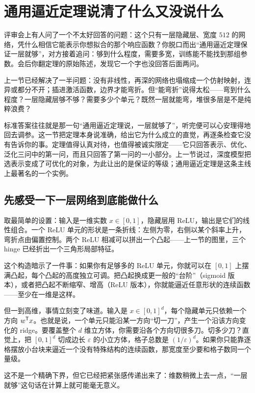 \section{通用逼近定理说清了什么又没说什么}
\label{sec:14-Deep-Learning/01-Representation-and-Approximation/02}


评审会上有人问了一个不太好回答的问题：这个只有一层隐藏层、宽度 \(512\) 的网络，凭什么相信它能表示你想拟合的那个响应函数？你脱口而出``通用逼近定理保证一层就够''，对方接着追问：够到什么程度，需要多宽，训练能不能找到那组参数。会后你翻定理的原始陈述，发现它一个字也没回答后面两问。

上一节已经解决了一半问题：没有非线性，再深的网络也塌缩成一个仿射映射，连异或都分不开；插进激活函数，边界才能弯折。但``能弯折''说得太松——弯到什么程度？一层隐藏层够不够？需要多少个单元？既然一层就能弯，堆很多层是不是纯粹浪费？

标准答案往往就是那一句``通用逼近定理说，一层就够了''，听完便可以心安理得地回去调参。这一节把定理本身说准确，给出它为什么成立的直觉，再逐条检查它没有告诉你的事。定理值得认真对待，也值得被诚实限定——它只回答表示、优化、泛化三问中的第一问，而且只回答了第一问的一小部分。上一节说过，深度模型把选表示变成了可优化的对象，为此让出的是保证的等级；通用逼近定理是这条主线上最著名的一个实例。

\subsection{先感受一下一层网络到底能做什么}

取最简单的设置：输入是一维实数 \(x\in[0,1]\)，隐藏层用 ReLU，输出是它们的线性组合。一个 ReLU 单元的形状是一条折线：左侧为零，右侧以某个斜率上升，弯折点由偏置控制。两个 ReLU 相减可以拼出一个凸起——上一节的图里，三个 hinge 已经折出一个三角形局部特征。

这个构造暗示了一件事：如果你有足够多的 ReLU 单元，你就可以在 \([0,1]\) 上摆满凸起，每个凸起的高度独立可调。把凸起换成更一般的``台阶''（sigmoid 版本），或者把凸起不断缩窄、增高（ReLU 版本），你就能逼近任意形状的连续函数——至少在一维是这样。

但一到高维，事情立刻变了味道。输入是 \(x\in[0,1]^d\)，每个隐藏单元只依赖一个方向 \(w^{\mathsf{T}}x\)。也就是说，一个单元只能沿某一方向``切一刀''，产生一个沿该方向变化的 ridge。要覆盖整个 \(d\) 维立方体，你需要沿各个方向切很多刀。切多少刀？直觉上，把 \([0,1]^d\) 切成边长 \(\varepsilon\) 的小立方体，格子总数是 \((1/\varepsilon)^d\)。如果你只能靠逐格摆放小台块来逼近一个没有特殊结构的连续函数，那宽度至少要和格子数同一个量级。

这不是一个精确下界，但它已经把紧张感传递出来了：维数稍微上去一点，``一层就够''这句话在计算上就可能毫无意义。

